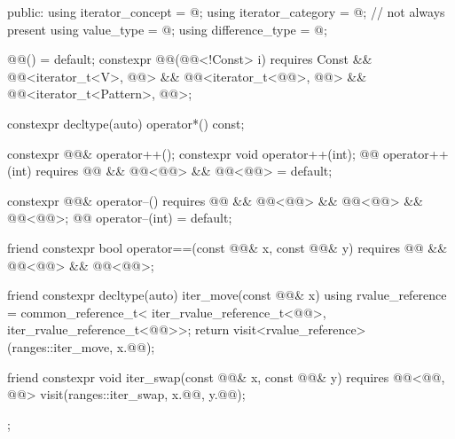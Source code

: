\begin{codeblock}
{{  public:
    using iterator_concept = @\seebelow@;
    using iterator_category = @\seebelow@;                                // not always present
    using value_type = @\seebelow@;
    using difference_type = @\seebelow@;

    @@() = default;
    constexpr @@(@@<!Const> i)
      requires Const && @@<iterator_t<V>, @@> &&
               @@<iterator_t<@@>, @@> &&
               @@<iterator_t<Pattern>, @@>;

    constexpr decltype(auto) operator*() const;

    constexpr @@& operator++();
    constexpr void operator++(int);
    @@ operator++(int)
      requires @@ && @@<@@> &&
               @@<@@> = default;

    constexpr @@& operator--()
      requires @@ && @@<@@> &&
               @@<@@> && @@<@@>;
    @@ operator--(int) = default;

    friend constexpr bool operator==(const @@& x, const @@& y)
      requires @@ && @@<@@> &&
               @@<@@>;

    friend constexpr decltype(auto) iter_move(const @@& x) {
      using rvalue_reference = common_reference_t<
        iter_rvalue_reference_t<@@>,
        iter_rvalue_reference_t<@@>>;
      return visit<rvalue_reference>(ranges::iter_move, x.@@);
    }

    friend constexpr void iter_swap(const @@& x, const @@& y)
      requires @@<@@, @@> {
      visit(ranges::iter_swap, x.@@, y.@@);
    }
  };
}
\end{codeblock}

